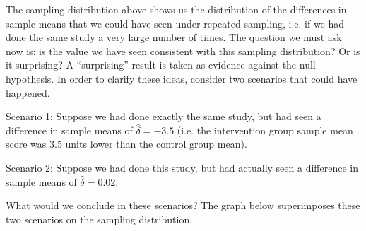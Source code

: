 \documentclass[letterpaper,10pt,english]{jupyterBook}
\begin{document}
\begin{sphinxVerbatim}[commandchars=\\\{\}]
  
  
   
   
\end{sphinxVerbatim}

\sphinxAtStartPar
The sampling distribution above shows us the distribution of the differences in sample means that we could have seen under repeated sampling, i.e. if we had done the same study a very large number of times. The question we must ask now is: is the value we have seen consistent with this sampling distribution? Or is it surprising? A “surprising” result is taken as evidence against the null hypothesis. In order to clarify these ideas, consider two scenarios that could have happened.

\sphinxAtStartPar
Scenario 1: Suppose we had done exactly the same study, but had seen a difference in sample means of \(\hat{\delta} = -3.5\) (i.e. the intervention group sample mean score was 3.5 units lower than the control group mean).

\sphinxAtStartPar
Scenario 2: Suppose we had done this study, but had actually seen a difference in sample means of \(\hat{\delta} = 0.02\).

\sphinxAtStartPar
What would we conclude in these scenarios? The graph below superimposes these two scenarios on the sampling distribution.
\end{document}

